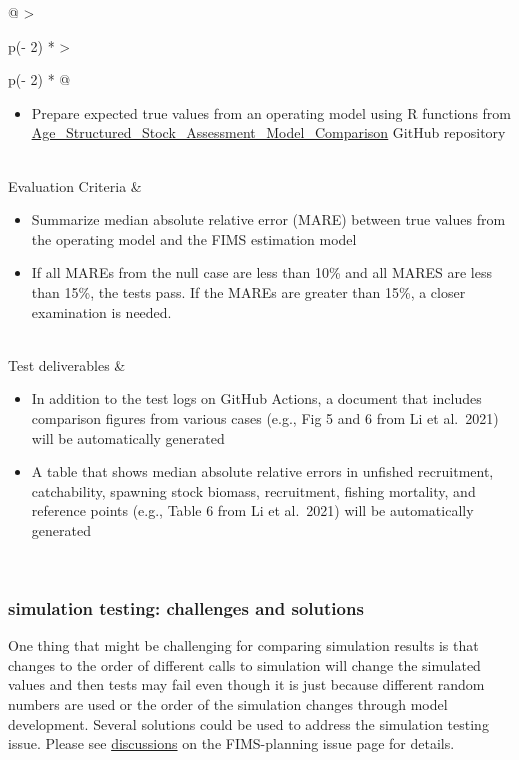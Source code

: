 \documentclass[
]{book}
\providecommand{\tightlist}{%
  \setlength{\itemsep}{0pt}\setlength{\parskip}{0pt}}
\begin{document}
\begin{longtable}[]{@{}
  >{\raggedright\arraybackslash}p{(\columnwidth - 2\tabcolsep) * }
  >{\raggedright\arraybackslash}p{(\columnwidth - 2\tabcolsep) * }@{}}
\begin{minipage}[t]{\linewidth}
\begin{itemize}
\tightlist
\item
  Prepare expected true values from an operating model using R functions from \href{https://github.com/Bai-Li-NOAA/Age_Structured_Stock_Assessment_Model_Comparison}{\underline{Age\_Structured\_Stock\_Assessment\_Model\_Comparison}} GitHub repository
\end{itemize}
\end{minipage} \\
Evaluation Criteria & \begin{minipage}[t]{\linewidth}\raggedright
\begin{itemize}
\item
  Summarize median absolute relative error (MARE) between true values from the operating model and the FIMS estimation model
\item
  If all MAREs from the null case are less than 10\% and all MARES are less than 15\%, the tests pass. If the MAREs are greater than 15\%, a closer examination is needed.
\end{itemize}
\end{minipage} \\
Test deliverables & \begin{minipage}[t]{\linewidth}\raggedright
\begin{itemize}
\item
  In addition to the test logs on GitHub Actions, a document that includes comparison figures from various cases (e.g., Fig 5 and 6 from Li et al.~2021) will be automatically generated
\item
  A table that shows median absolute relative errors in unfished recruitment, catchability, spawning stock biomass, recruitment, fishing mortality, and reference points (e.g., Table 6 from Li et al.~2021) will be automatically generated
\end{itemize}
\end{minipage} \\
\bottomrule
\end{longtable}

\hypertarget{simulation-testing-challenges-and-solutions}{%
\subsubsection{simulation testing: challenges and solutions}\label{simulation-testing-challenges-and-solutions}}

One thing that might be challenging for comparing simulation results is that changes to the order of different calls to simulation will change the simulated values and then tests may fail even though it is just because different random numbers are used or the order of the simulation changes through model development. Several solutions could be used to address the simulation testing issue. Please see \href{https://github.com/NOAA-FIMS/FIMS-planning/issues/25}{discussions} on the FIMS-planning issue page for details.
\end{document}
